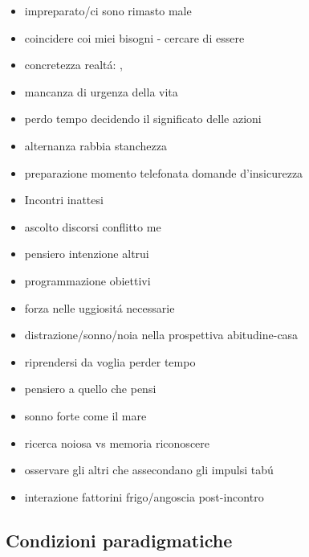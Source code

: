 \begin{itemize}
\item impreparato/ci sono rimasto male

\item coincidere coi miei bisogni - cercare di essere

\item concretezza realt\'a: , 

\item mancanza di urgenza della vita

\item perdo tempo decidendo il significato delle azioni

\item alternanza rabbia stanchezza

\item preparazione momento telefonata domande d’insicurezza

\item Incontri inattesi

\item ascolto discorsi conflitto me

\item pensiero intenzione altrui

\item programmazione obiettivi

\item forza nelle uggiosit\'a necessarie

\item distrazione/sonno/noia nella prospettiva abitudine-casa

\item riprendersi da voglia perder tempo

\item pensiero a quello che pensi

\item sonno forte come il mare

\item ricerca noiosa vs memoria riconoscere

\item osservare gli altri che assecondano gli impulsi tab\'u

\item interazione fattorini frigo/angoscia post-incontro

\end{itemize}

\subsection{Condizioni paradigmatiche}

